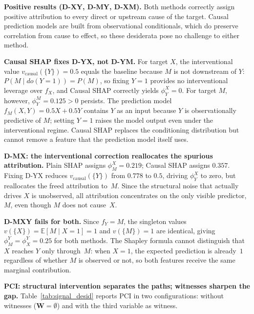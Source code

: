 \noindent\textbf{Positive results (D-XY, D-MY, D-XM).}
Both methods correctly assign positive attribution to every direct or upstream cause
of the target. Causal prediction models are built from observational conditionals,
which do preserve correlation from cause to effect, so these desiderata pose no
challenge to either method.

\noindent\textbf{Causal SHAP fixes D-YX, not D-YM.}
For target $X$, the interventional value $v_{\mathrm{causal}}(\{Y\})=0.5$ equals
the baseline because $M$ is not downstream of $Y$: $P(M\mid do(Y{=}1))=P(M)$,
so fixing $Y=1$ provides no interventional leverage over $f_X$, and Causal SHAP
correctly yields $\phi_Y^X=0$.
For target $M$, however, $\phi_Y^M=0.125>0$ persists.
The prediction model $f_M(X,Y)=0.5X+0.5Y$ contains $Y$ as an input because $Y$ is
observationally predictive of $M$; setting $Y=1$ raises the model output even under
the interventional regime.
Causal SHAP replaces the conditioning distribution but cannot remove a feature that
the prediction model itself uses.

\noindent\textbf{D-MX: the interventional correction reallocates the spurious attribution.}
Plain SHAP assigns $\phi_M^X=0.219$; Causal SHAP assigns $0.357$.
Fixing D-YX reduces $v_{\mathrm{causal}}(\{Y\})$ from $0.778$ to $0.5$, driving
$\phi_Y^X$ to zero, but reallocates the freed attribution to~$M$.
Since the structural noise that actually drives $X$ is unobserved, all attribution
concentrates on the only visible predictor,~$M$, even though $M$ does not cause~$X$.

\noindent\textbf{D-MXY fails for both.}
Since $f_Y=M$, the singleton values $v(\{X\})=\mathbb{E}[M\mid X{=}1]=1$ and
$v(\{M\})=1$ are identical, giving $\phi_M^Y=\phi_X^Y=0.25$ for both methods.
The Shapley formula cannot distinguish that $X$ reaches $Y$ only through~$M$:
when $X=1$, the expected prediction is already~$1$ regardless of whether $M$ is
observed or not, so both features receive the same marginal contribution.

\noindent\textbf{PCI: structural intervention separates the paths; witnesses
sharpen the gap.}
Table~\ref{tab:signal_desid} reports PCI in two configurations: without
witnesses ($\mathbf{W}=\emptyset$) and with the third variable as witness.

